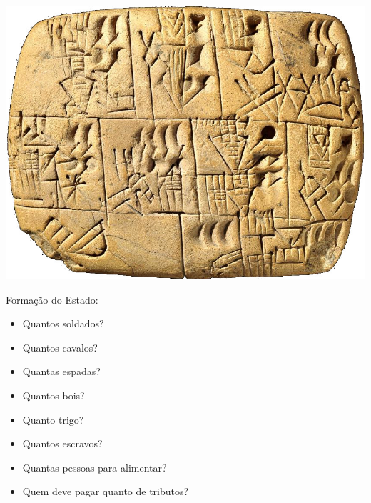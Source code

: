 \begin{multicols}{2}

	\begin{center}
	\includegraphics[width=\linewidth]{./IMG/argila.jpeg}
	\end{center}

\vfill
\columnbreak

	Formação do Estado:
\large
\begin{itemize}
	\item Quantos soldados?
	\item Quantos cavalos?
	\item Quantas espadas?
	\item Quantos bois?
	\item Quanto trigo?
	\item Quantos escravos?
	\item Quantas pessoas para alimentar?
	\item Quem deve pagar quanto de tributos?
	
\end{itemize}


\end{multicols}
